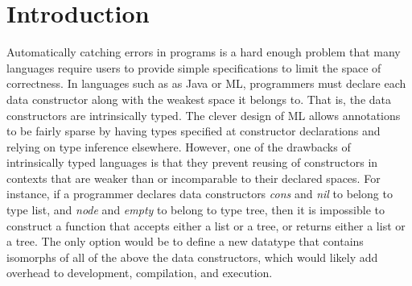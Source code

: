 \documentclass[acmsmall]{acmart}
\theoremstyle{definition}
\begin{document}
\newcommand{\is}{\ ::=\ }
\newcommand{\sep}{\ \ |\ \ }
\newcommand{\nonterm}[1]{#1\ }
\newcommand{\contin}{|\ \ \ \ \ \ \ }
\newcommand{\wrt}{\B{wrt }}



\newcommand{\pc}{\hfill \break \noindent \ $\diamond$ \ }


\newcommand{\N}{\ $\cdot$\ \ }

\newcommand{\pitem}{\item[$\diamond$]}

\newcommand{\tl}{\textasciitilde{}}
\newcommand{\typdiff}{\J{\textbackslash}}

\maketitle


\section{Introduction}
\label{sec:introduction}






Automatically catching errors in programs is a hard enough problem
that many languages require users to provide simple specifications to limit the space of correctness.
In languages such as as Java or ML, programmers must declare each data constructor along with the weakest space it belongs to. 
That is, the data constructors are intrinsically typed.
The clever design of ML allows annotations to be fairly sparse by 
having types specified at constructor declarations and relying on type inference elsewhere.
However, one of the drawbacks of intrinsically typed languages is that they prevent reusing of
constructors in contexts that are weaker than or incomparable to their declared spaces. 
For instance, if a programmer declares data constructors \emph{cons} and \emph{nil} to belong to type list,
and \emph{node} and \emph{empty} to belong to type tree, then it is impossible to construct a function
that accepts either a list or a tree, or returns either a list or a tree. The only option would be to define
a new datatype that contains isomorphs of all of the above the data constructors, which would 
likely add overhead to development, compilation, and execution.
\end{document}
